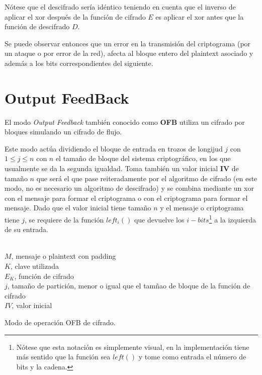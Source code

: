 Nótese que el descifrado sería idéntico teniendo en cuenta que el inverso de aplicar el xor después de la función de cifrado $E$ es aplicar el xor antes que la función de descifrado $D$.

Se puede observar entonces que un error en la transmisión del criptograma (por un ataque o por error de la red), afecta al bloque entero del plaintext asociado y además a los bits correspondientes del siguiente.


\section{Output FeedBack}
\label{sec:OFB}
El modo \textit{Output Feedback} también conocido como \textbf{OFB} utiliza un cifrado por bloques simulando un cifrado de flujo.

Este modo actúa dividiendo el bloque de entrada en trozos de longijud $j$ con $1 \leq j \leq n$ con $n$ el tamaño de bloque del sistema criptográfico, en los que usualmente se da la segunda igualdad. Toma también un valor inicial \textbf{IV} de tamaño $n$ que será el que pase reiteradamente por el algoritmo de cifrado (en este modo, no es necesario un algoritmo de descifrado) y se combina mediante un xor con el mensaje para formar el criptograma o con el criptograma para formar el mensaje. Dado que el valor inicial tiene tamaño $n$ y el mensaje o criptograma tiene $j$, se requiere de la función $left_i()$ que devuelve los $i-bits$\footnote{Nótese que esta notación es simplemente visual, en la implementación tiene más sentido que la función sea $left()$ y tome como entrada el número de bits y la cadena.} a la izquierda de su entrada.

\begin{algorithm}[H]
	\begin{algorithmic}[1]
		\small
		\REQUIRE \ \\
			\texttt{$M$}, mensaje o plaintext con padding\\
			\texttt{$K$}, clave utilizada\\
			\texttt{$E_K$}, función de cifrado\\
			\texttt{$j$}, tamaño de partición, menor o igual que el tamñao de bloque de la función de cifrado\\
			\texttt{$IV$}, valor inicial
		
		\ENDFOR
	\end{algorithmic}
	\caption{Modo de operación OFB de cifrado.}
	\label{alg:OFB}
\end{algorithm}

